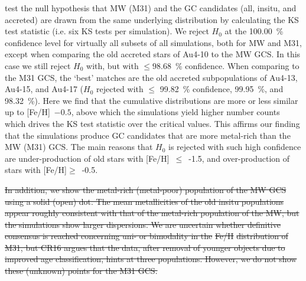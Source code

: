 \documentclass[a4paper,fleqn,usenatbib]{mnras}
\providecommand{\DIFadd}[1]{{\protect\color{blue}\uwave{#1}}} %
\providecommand{\DIFdel}[1]{{\protect\color{red}\sout{#1}}}                      %
\providecommand{\DIFaddend}{} %
\providecommand{\DIFdelbegin}{} %
\begin{document}
\DIFadd{Finally, we }\DIFaddend test the null hypothesis that MW (M31) and the GC candidates (all, insitu, and
accreted) are drawn from the same underlying distribution by calculating the KS
test statistic (i.e. six KS tests per simulation). We reject $H_0$ at the 100.00~\%
confidence level for virtually all subsets of all simulations, both for MW and M31,
except when comparing the old accreted stars of \mbox{Au4-10} to the MW GCS. In this
case we still reject $H_0$ with, but with $\leq 98.68$~\% confidence. When comparing
to the M31 GCS, the `best' matches are the old accreted subpopulations of \mbox{Au4-13},
\mbox{Au4-15}, and \mbox{Au4-17} ($H_0$ rejected with $\leq$ 99.82~\% confidence, 99.95~\%,
and 98.32~\%). Here we find that the cumulative distributions are more or less
similar up to [Fe/H]~$-0.5$, above which the simulations yield higher number
counts which drives the KS test statistic over the critical values. This affirms
our finding that the simulations produce GC candidates that are more metal-rich
than the MW (M31) GCS. The main reasons that $H_0$ is rejected with such
high confidence are under-production of old stars with [Fe/H]~$\leq$~-1.5,
and over-production of stars with [Fe/H]$\geq$~-0.5.



\DIFdelbegin \DIFdel{In addition, we show the metal-rich (metal-poor) population of the MW GCS using
a solid (open) dot. The mean metallicities of the old insitu populations appear
roughly consistent with that of the metal-rich population of the MW, but the
simulations show larger dispersions. We are uncertain whether definitive consensus
is reached concerning uni- or bimodality in the }%
\DIFdel{Fe/H}%
\DIFdel{distribution of M31, but
CR16 argues that the data, after removal of younger objects due to improved age
classification, hints at three populations. However, we do not show these (unknown)
points for the M31 GCS.
}%
\end{document}
